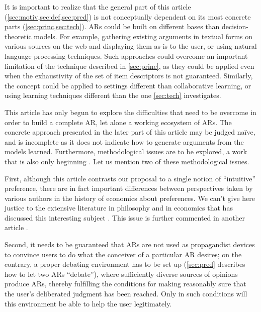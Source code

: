 \documentclass[version=3.21, pagesize, twoside=off, bibliography=totoc, DIV=calc, fontsize=12pt, a4paper, french, english]{scrartcl}
\begin{document}
It is important to realize that the general part of this article (\cref{sec:motiv,sec:def,sec:pred}) is not conceptually dependent on its most concrete parts (\cref{sec:princ,sec:tech}). \Acp{AR} could be built on different bases than decision-theoretic models. For example, gathering existing arguments in textual forms on various sources on the web and displaying them as-is to the user, or using natural language processing techniques. 
Such approaches could overcome an important limitation of the technique described in \cref{sec:princ}, as they could be applied even when the exhaustivity of the set of item descriptors is not guaranteed.
Similarly, the concept could be applied to settings different than collaborative learning, or using learning techniques different than the one \cref{sec:tech} investigates.

This article has only begun to explore the difficulties that need to be overcome in order to build a complete \ac{AR}, let alone a working ecosystem of \acp{AR}. The concrete approach presented in the later part of this article may be judged naïve, and is incomplete as it does not indicate how to generate arguments from the models learned. 
Furthermore, methodological issues are to be explored, a work that is also only beginning \citep{cailloux_formal_2018}. Let us mention two of these methodological issues.

First,
although this article contrasts our proposal to a single notion of “intuitive” preference, there are in fact important differences between perspectives taken by various authors in the history of economics about preferences. We can’t give here justice to the extensive literature in philosophy and in economics that has discussed this interesting subject \citep{bruni_vilfredo_2001}. This issue is further commented in another article \citep{meinard_justification_2018}.

Second, it needs to be guaranteed that \acp{AR} are not used as propagandist devices to convince users to do what the conceiver of a particular \ac{AR} desires; on the contrary, a proper debating environment has to be set up (\cref{sec:pred} describes how to let two \acp{AR} “debate”), where sufficiently diverse sources of opinions produce \acp{AR}, thereby fulfilling the conditions for making reasonably sure that the user’s deliberated judgment has been reached. Only in such conditions will this environment be able to help the user legitimately.


\end{document}
